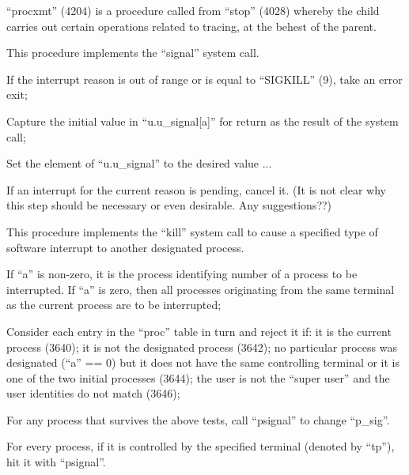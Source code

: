 ``procxmt'' (4204) is a procedure called
from ``stop'' (4028) whereby the child
carries out certain operations related
to tracing, at the behest of the
parent.


This procedure implements the ``signal''
system call.

\bd
\item[3619:] If the interrupt reason is out of
 range or is equal to ``SIGKILL''
 (9), take an error exit;

\item[3623:] Capture the initial value in
``u.u\_signal[a]'' for return as the
result of the system call;

\item[3624:] Set the element of ``u.u\_signal''
to the desired value ...

\item[3625:] If an interrupt for the current
reason is pending, cancel it. (It
is not clear why this step should
be necessary or even desirable.
Any suggestions??)
\ed



This procedure implements the ``kill''
system call to cause a specified type
of software interrupt to another designated process.

\bd
\item[3637:] If ``a'' is non-zero, it is the
 process identifying number of a
 process to be interrupted. If
 ``a'' is zero, then all processes
 originating from the same terminal as the current process are to
 be interrupted;

\item[3639:] Consider each entry in the ``proc''
table in turn and reject it if:
it is the current process (3640);
it is not the designated process
(3642);
no particular process was designated (``a'' == 0) but it does not
have the same controlling terminal or it is
one of the two initial processes (3644);
the user is not the ``super user''
and the user identities do not
match (3646);

\item[3649:] For any process that survives the
above tests, call ``psignal'' to
change ``p\_sig''.
\ed



For every process, if it is controlled
by the specified terminal (denoted by
``tp''), hit it with ``psignal''.



